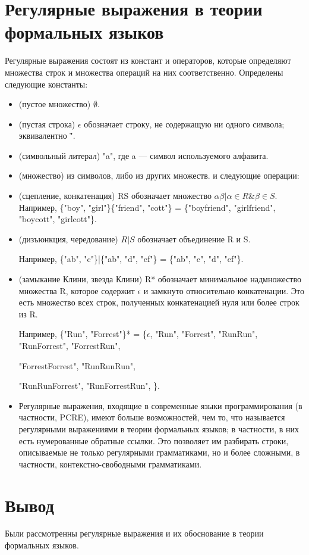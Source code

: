 \documentclass[12pt]{report}
\begin{document}
\section{Регулярные выражения в теории формальных языков}
Регулярные выражения состоят из констант и операторов, которые определяют множества строк и множества операций на них соответственно. Определены следующие константы:
\begin{itemize}
\item (пустое множество) $\emptyset$.
\item (пустая строка) $\epsilon$ обозначает строку, не содержащую ни одного символа; эквивалентно \"".
\item (символьный литерал) "a", где a — символ используемого алфавита.
\item (множество) из символов, либо из других множеств.
и следующие операции:
\end{itemize}
\begin{itemize}
	\item (сцепление, конкатенация) RS обозначает множество ${\alpha\beta | \alpha \in R  \& \beta \in S}$. Например, \{"boy", "girl"\}\{"friend", "cott"\} = \{"boyfriend", "girlfriend", "boycott", "girlcott"\}.
	\item(дизъюнкция, чередование) $R|S$ обозначает объединение R и S.
	
	 Например, \{"ab", "c"\}|\{"ab", "d", "ef"\} = \{"ab", "c", "d", "ef"\}.
	\item(замыкание Клини, звезда Клини) R* обозначает минимальное надмножество множества R, которое содержит $\epsilon$ и замкнуто относительно конкатенации. Это есть множество всех строк, полученных конкатенацией нуля или более строк из R.
	
	 Например, \{"Run", "Forrest"\}* = \{$\epsilon$, "Run", "Forrest", "RunRun", "RunForrest", "ForrestRun",
	 
	  "ForrestForrest", "RunRunRun",
	
	 "RunRunForrest", "RunForrestRun", \}.
	\item Регулярные выражения, входящие в современные языки программирования (в частности, PCRE), имеют больше возможностей, чем то, что называется регулярными выражениями в теории формальных языков; в частности, в них есть нумерованные обратные ссылки. Это позволяет им разбирать строки, описываемые не только регулярными грамматиками, но и более сложными, в частности, контекстно-свободными грамматиками.
\end{itemize}
\section{Вывод}
Были рассмотренны регулярные выражения и их обоснование в теории формальных языков.
\end{document}
